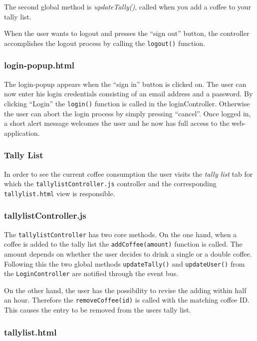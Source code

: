 The second global method is \emph{updateTally()}, called when you add a
coffee to your tally list.

When the user wants to logout and presses the ``sign out'' button, the
controller accomplishes the logout process by calling the
\texttt{logout()} function.

\subsubsection*{login-popup.html}

The login-popup appears when the ``sign in'' button is clicked on. The
user can now enter his login credentials consisting of an email address
and a password. By clicking ``Login'' the \texttt{login()} function is
called in the loginController. Otherwise the user can abort the login
process by simply pressing ``cancel''. Once logged in, a short alert
message welcomes the user and he now has full access to the
web-application.

\subsubsection{Tally List}\label{tally-list}

In order to see the current coffee consumption the user visits the
\emph{tally list} tab for which the \texttt{tallylistController.js}
controller and the corresponding \texttt{tallylist.html} view is
responsible.

\subsubsection*{tallylistController.js}

The \texttt{tallylistController} has two core methods. On the one hand,
when a coffee is added to the tally list the \texttt{addCoffee(amount)}
function is called. The amount depends on whether the user decides to
drink a single or a double coffee. Following this the two global methods
\texttt{updateTally()} and \texttt{updateUser()} from the
\texttt{LoginController} are notified through the event bus.

On the other hand, the user has the possibility to revise the adding
within half an hour. Therefore the \texttt{removeCoffee(id)} is called
with the matching coffee ID. This causes the entry to be removed from
the users tally list.

\subsubsection*{tallylist.html}

